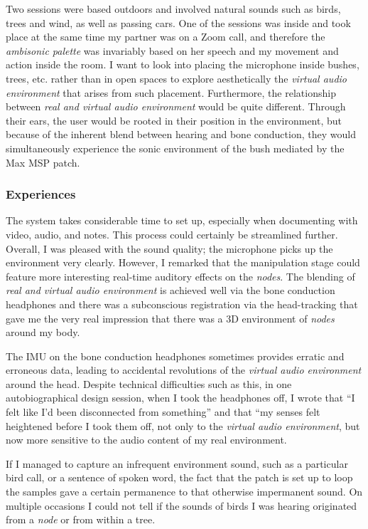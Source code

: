 Two sessions were based outdoors and involved natural sounds such as birds, trees and wind, as well as passing cars. One of the sessions was inside and took place at the same time my partner was on a Zoom call, and therefore the \textit{ambisonic palette} was invariably based on her speech and my movement and action inside the room. I want to look into placing the microphone inside bushes, trees, etc. rather than in open spaces to explore aesthetically the \textit{virtual audio environment} that arises from such placement. Furthermore, the relationship between \textit{real and virtual audio environment} would be quite different. Through their ears, the user would be rooted in their position in the environment, but because of the inherent blend between hearing and bone conduction, they would simultaneously experience the sonic environment of the bush mediated by the Max MSP patch.

\subsubsection{Experiences}                     \label{sec: area-study-results-experiences}
The system takes considerable time to set up, especially when documenting with video, audio, and notes. This process could certainly be streamlined further. Overall, I was pleased with the sound quality; the microphone picks up the environment very clearly. However, I remarked that the manipulation stage could feature more interesting real-time auditory effects on the \textit{nodes}. The blending of \textit{real and virtual audio environment} is achieved well via the bone conduction headphones and there was a subconscious registration via the head-tracking that gave me the very real impression that there was a 3D environment of \textit{nodes} around my body.

The IMU on the bone conduction headphones sometimes provides erratic and erroneous data, leading to accidental revolutions of the \textit{virtual audio environment} around the head. Despite technical difficulties such as this, in one autobiographical design session, when I took the headphones off, I wrote that “I felt like I'd been disconnected from something” and that “my senses felt heightened before I took them off, not only to the \textit{virtual audio environment}, but now more sensitive to the audio content of my real environment.

If I managed to capture an infrequent environment sound, such as a particular bird call, or a sentence of spoken word, the fact that the patch is set up to loop the samples gave a certain permanence to that otherwise impermanent sound. On multiple occasions I could not tell if the sounds of birds I was hearing originated from a \textit{node} or from within a tree.

